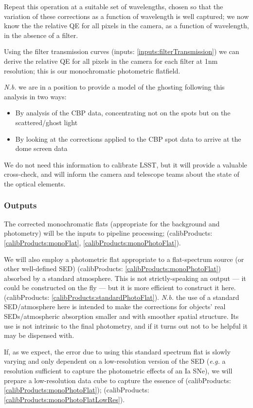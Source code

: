 \documentclass[12pt]{article}
\newcommand{\eg}{\textit{e.g.}\xspace}
\newcommand{\Nb}{\textit{N.b.}\xspace}
\newcommand{\inputData}[1]{(inputs: \ref{inputs:#1})}
\newcommand{\outputData}[1]{(calibProducts: \ref{calibProducts:#1})}
\newcommand{\outputDataII}[2]{(calibProducts: \ref{calibProducts:#1}, \ref{calibProducts:#2})}
\begin{document}
\begin{itemize}
  Repeat this operation at a suitable set of wavelengths, chosen so that the variation of these corrections as
  a function of wavelength is well captured; we now know the the relative QE for all pixels in the camera, as
  a function of wavelength, in the absence of a filter.
  
  Using the filter transmission curves \inputData{filterTransmission} we can derive the relative QE for all
  pixels in the camera for each filter at 1nm resolution; this is our monochromatic photometric flatfield.

  \Nb we are in a position to provide a model of the ghosting following this analysis in two ways:
  \begin{itemize}
  \item By analysis of the CBP data, concentrating not on the spots but on the scattered/ghost light
  \item By looking at the corrections applied to the CBP spot data to arrive at the dome screen data
  \end{itemize}
  We do not need this information to calibrate LSST, but it will provide a valuable cross-check, and
  will inform the camera and telescope teams about the state of the optical elements.

\subsubsection{Outputs}
  
The corrected monochromatic flats (appropriate for the background and photometry) will be the inputs to
pipeline processing; \outputDataII{monoFlat}{monoPhotoFlat}.

We will also employ a photometric flat appropriate to a flat-spectrum source (or other well-defined SED)
\outputData{monoPhotoFlat} absorbed by a standard atmosphere.  This is not strictly-speaking an output --- it
could be constructed on the fly --- but it is more efficient to construct it here.
\outputData{standardPhotoFlat}.  \Nb the use of a standard SED/atmosphere here is intended to make the
corrections for objects' real SEDs/atmospheric absorption smaller and with smoother spatial structure.
Its use is not intrinsic to the final photometry, and if it turns out not to be helpful it may be
dispensed with.

If, as we expect, the error due to using this standard spectrum flat is slowly varying and only dependent on a
low-resolution version of the SED (\eg a resolution sufficient to capture the photometric effects of an Ia
SNe), we will prepare a low-resolution data cube to capture the essence of \outputData{monoPhotoFlat};
\outputData{monoPhotoFlatLowRes}.

\end{itemize}
\end{document}

